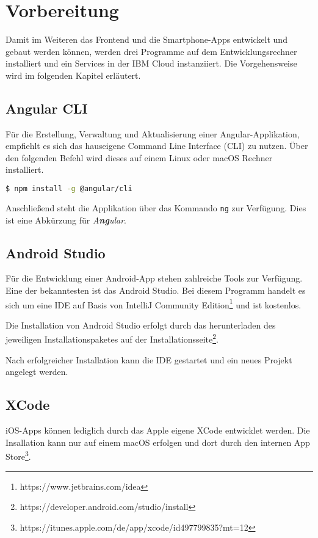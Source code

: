 \section{Vorbereitung}
Damit im Weiteren das Frontend und die Smartphone-Apps entwickelt und gebaut werden können, werden drei Programme auf
dem Entwicklungsrechner installiert und ein Services in der IBM Cloud instanziiert. Die Vorgehensweise wird im
folgenden Kapitel erläutert.

\subsection{Angular CLI}
Für die Erstellung, Verwaltung und Aktualisierung einer Angular-Applikation, empfiehlt es sich das hauseigene Command
Line Interface (CLI) zu nutzen. Über den folgenden Befehl wird dieses auf einem Linux oder macOS Rechner installiert.

\begin{lstlisting}[language=bash, caption=Installation des Angular CLI, label=ls:vorbereitung_angularcli]
$ npm install -g @angular/cli
\end{lstlisting}

Anschließend steht die Applikation über das Kommando \texttt{ng} zur Verfügung. Dies ist eine Abkürzung für
\textit{A\textbf{ng}ular}.

\subsection{Android Studio}
Für die Entwicklung einer Android-App stehen zahlreiche Tools zur Verfügung. Eine der bekanntesten ist das Android
Studio. Bei diesem Programm handelt es sich um eine IDE auf Basis von IntelliJ Community
Edition\footnote{https://www.jetbrains.com/idea} und ist kostenlos.

Die Installation von Android Studio erfolgt durch das herunterladen des jeweiligen Installationspaketes auf der
Installationsseite\footnote{https://developer.android.com/studio/install}.

Nach erfolgreicher Installation kann die IDE gestartet und ein neues Projekt angelegt werden.

\subsection{XCode}
iOS-Apps können lediglich durch das Apple eigene XCode entwicklet werden. Die Insallation kann nur auf einem macOS
erfolgen und dort durch den internen App Store\footnote{https://itunes.apple.com/de/app/xcode/id497799835?mt=12}.

